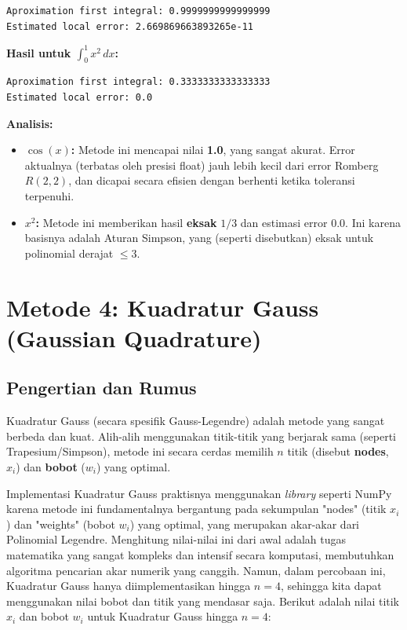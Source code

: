 \documentclass[a4paper, 11pt]{article} %
\begin{document}
\begin{lstlisting}[language={}, caption={}, numbers=none] 
Aproximation first integral: 0.9999999999999999
Estimated local error: 2.669869663893265e-11
\end{lstlisting} 

\textbf{Hasil %
untuk $\int_0^1 x^2 \, dx$:} 

\begin{lstlisting}[language={}, caption={}, numbers=none] 
Aproximation first integral: 0.3333333333333333
Estimated local error: 0.0
\end{lstlisting} %

\textbf{Analisis:} %
\begin{itemize}
    \item \textbf{$\cos(x)$:} Metode ini mencapai nilai \textbf{1.0}, yang sangat akurat. %
    Error aktualnya (terbatas oleh presisi float) jauh lebih kecil dari error Romberg $R(2,2)$, dan dicapai secara efisien dengan berhenti ketika toleransi terpenuhi. %
    \item \textbf{$x^2$:} Metode ini memberikan hasil \textbf{eksak} $1/3$ dan estimasi error $0.0$. %
    Ini karena basisnya adalah Aturan Simpson, yang (seperti disebutkan) eksak untuk polinomial derajat $\le 3$. %
\end{itemize}

\newpage %
\section{Metode 4: Kuadratur Gauss (Gaussian Quadrature)} %

\subsection{Pengertian dan Rumus} %
Kuadratur Gauss (secara spesifik Gauss-Legendre) adalah metode yang sangat berbeda dan kuat. Alih-alih menggunakan titik-titik yang berjarak sama (seperti Trapesium/Simpson), metode ini secara cerdas memilih $n$ titik (disebut \textbf{nodes}, $x_i$) dan \textbf{bobot} ($w_i$) yang optimal. 

Implementasi Kuadratur Gauss praktisnya menggunakan \textit{library} seperti NumPy karena metode ini fundamentalnya bergantung pada sekumpulan "nodes" (titik $x_i$) dan "weights" (bobot $w_i$) yang optimal, yang merupakan akar-akar dari Polinomial Legendre. Menghitung nilai-nilai ini dari awal adalah tugas matematika yang sangat kompleks dan intensif secara komputasi, membutuhkan algoritma pencarian akar numerik yang canggih. Namun, dalam percobaan ini, Kuadratur Gauss hanya diimplementasikan hingga $n=4$, sehingga kita dapat menggunakan nilai bobot dan titik yang mendasar saja. Berikut adalah nilai titik $x_i$ dan bobot $w_i$ untuk Kuadratur Gauss hingga $n=4$:
\end{document}
